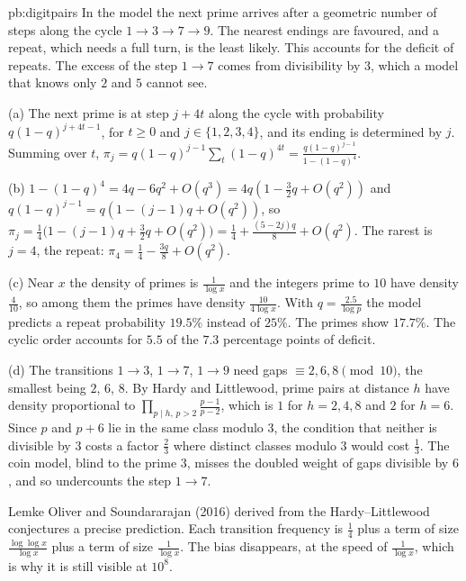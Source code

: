 \begin{solution}{pb:digitpairs}
\idea In the model the next prime arrives after a geometric number of steps along the cycle $1\to3\to7\to9$. The nearest endings are favoured, and a repeat, which needs a full turn, is the least likely. This accounts for the deficit of repeats. The excess of the step $1\to7$ comes from divisibility by $3$, which a model that knows only $2$ and $5$ cannot see.

\writeup (a) The next prime is at step $j+4t$ along the cycle with probability $q(1-q)^{j+4t-1}$, for $t\ge0$ and $j\in\{1,2,3,4\}$, and its ending is determined by $j$.
Summing over $t$, $\pi_j=q(1-q)^{j-1}\sum_t(1-q)^{4t}=\frac{q(1-q)^{j-1}}{1-(1-q)^4}$.

(b) $1-(1-q)^4=4q-6q^2+O(q^3)=4q(1-\frac32q+O(q^2))$ and $q(1-q)^{j-1}=q(1-(j-1)q+O(q^2))$, so
$\pi_j=\frac14\bigl(1-(j-1)q+\frac32q+O(q^2)\bigr)=\frac14+\frac{(5-2j)q}8+O(q^2)$. The rarest is $j=4$, the repeat: $\pi_4=\frac14-\frac{3q}8+O(q^2)$.

(c) Near $x$ the density of primes is $\frac1{\log x}$ and the integers prime to $10$ have density $\frac4{10}$, so among them the primes have density $\frac{10}{4\log x}$. With $q=\frac{2.5}{\log p}$ the
model predicts a repeat probability $19.5\%$ instead of $25\%$. The primes show $17.7\%$. The cyclic order accounts for $5.5$ of the $7.3$ percentage points of deficit.

(d) The transitions $1\to3$, $1\to7$, $1\to9$ need gaps $\equiv2,6,8\pmod{10}$, the smallest being $2$, $6$, $8$. By Hardy and Littlewood, prime pairs at distance $h$ have density
proportional to $\prod_{p\mid h,\,p>2}\frac{p-1}{p-2}$, which is $1$ for $h=2,4,8$ and $2$ for $h=6$. Since $p$ and $p+6$ lie in the same class modulo $3$, the condition that neither is divisible by $3$ costs a factor $\frac23$ where distinct classes modulo $3$ would cost $\frac13$. The coin model, blind to the prime $3$, misses the doubled weight of gaps divisible by $6$, and so undercounts the step $1\to7$.

\leads Lemke Oliver and Soundararajan (2016) derived from the Hardy--Littlewood conjectures a precise prediction. Each transition frequency is $\frac14$ plus a term of size
$\frac{\log\log x}{\log x}$ plus a term of size $\frac1{\log x}$. The bias disappears, at the speed of $\frac1{\log x}$, which is why it is still visible at $10^8$.
\end{solution}

